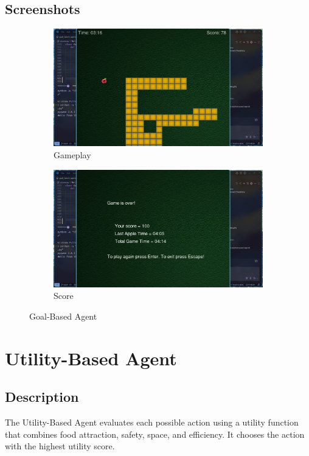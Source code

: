 \documentclass[11pt,a4paper]{article}
\begin{document}
\subsection{Screenshots}
\begin{figure}[H]
    \centering
    \begin{subfigure}{0.45\textwidth}
        \includegraphics[width=\textwidth]{ss/goal_based_play.png}
        \caption{Gameplay}
    \end{subfigure}
    \hfill
    \begin{subfigure}{0.45\textwidth}
        \includegraphics[width=\textwidth]{ss/goal_based_result.png}
        \caption{Score}
    \end{subfigure}
    \caption{Goal-Based Agent}
\end{figure}

\section{Utility-Based Agent}
\subsection{Description}
The Utility-Based Agent evaluates each possible action using a utility function that combines food attraction, safety, space, and efficiency. It chooses the action with the highest utility score.
\end{document}
